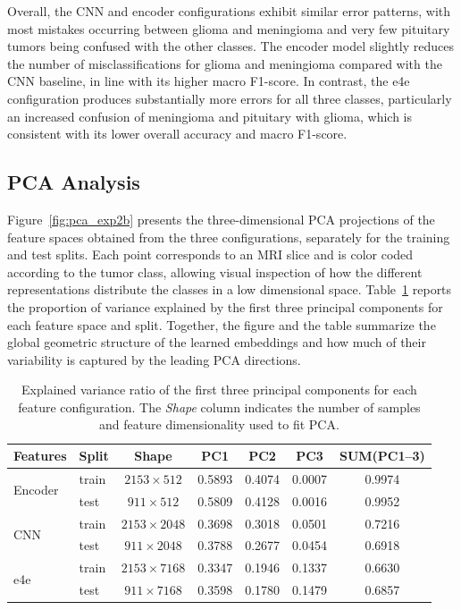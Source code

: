 Overall, the CNN and encoder configurations exhibit similar error patterns, with most mistakes occurring between glioma and meningioma and very few pituitary tumors being confused with the other classes. The encoder model slightly reduces the number of misclassifications for glioma and meningioma compared with the CNN baseline, in line with its higher macro F1-score. In contrast, the e4e configuration produces substantially more errors for all three classes, particularly an increased confusion of meningioma and pituitary with glioma, which is consistent with its lower overall accuracy and macro F1-score.
\subsection{PCA Analysis}

Figure~\ref{fig:pca_exp2b} presents the three-dimensional PCA projections of the feature spaces obtained from the three configurations, separately for the training and test splits. Each point corresponds to an MRI slice and is color coded according to the tumor class, allowing visual inspection of how the different representations distribute the classes in a low dimensional space. Table~\ref{tab:pca_variance} reports the proportion of variance explained by the first three principal components for each feature space and split. Together, the figure and the table summarize the global geometric structure of the learned embeddings and how much of their variability is captured by the leading PCA directions.


\begin{table}[H]
    \centering
    \caption{Explained variance ratio of the first three principal components
             for each feature configuration. The \emph{Shape} column indicates
             the number of samples and feature dimensionality used to fit PCA.}
    \label{tab:pca_variance}
    \begin{tabular}{llccccc}
        \toprule
        Features      & Split & Shape              & PC1    & PC2    & PC3    & SUM(PC1--3) \\
        \midrule
        \multirow{2}{*}{Encoder} 
                      & train & \(2153 \times 512\)  & 0.5893 & 0.4074 & 0.0007 & 0.9974 \\
                      & test  & \(911 \times 512\)   & 0.5809 & 0.4128 & 0.0016 & 0.9952 \\
        \midrule
        \multirow{2}{*}{CNN} 
                      & train & \(2153 \times 2048\) & 0.3698 & 0.3018 & 0.0501 & 0.7216 \\
                      & test  & \(911 \times 2048\)  & 0.3788 & 0.2677 & 0.0454 & 0.6918 \\
        \midrule
        \multirow{2}{*}{e4e} 
                      & train & \(2153 \times 7168\) & 0.3347 & 0.1946 & 0.1337 & 0.6630 \\
                      & test  & \(911 \times 7168\)  & 0.3598 & 0.1780 & 0.1479 & 0.6857 \\
        \bottomrule
    \end{tabular}
\end{table}



